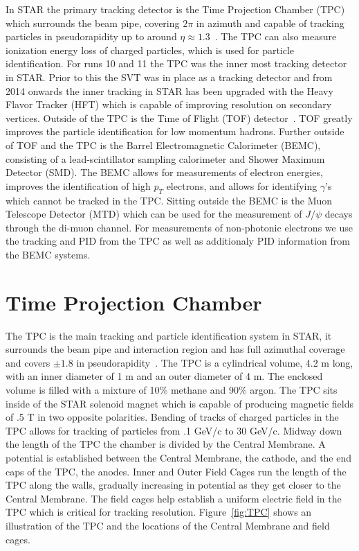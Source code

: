 In STAR the primary tracking detector is the Time Projection Chamber (TPC) which surrounds the beam pipe, covering $2\pi$ in azimuth and capable of tracking particles in pseudorapidity up to around $\eta \approx 1.3$~\cite{tpcNIM}. The TPC can also measure ionization energy loss of charged particles, which is used for particle identification. For runs 10 and 11 the TPC was the inner most tracking detector in STAR. Prior to this the SVT was in place as a tracking detector and from 2014 onwards the inner tracking in STAR has been upgraded with the Heavy Flavor Tracker (HFT) which is capable of improving resolution on secondary vertices. Outside of the TPC is the Time of Flight (TOF) detector~\cite{vpdNIM}. TOF greatly improves the particle identification for low momentum hadrons. Further outside of TOF and the TPC is the Barrel Electromagnetic Calorimeter (BEMC), consisting of a lead-scintillator sampling calorimeter and Shower Maximum Detector (SMD). The BEMC allows for measurements of electron energies, improves the identification of high $p_T$ electrons, and allows for identifying $\gamma$'s which cannot be tracked in the TPC. Sitting outside the BEMC is the Muon Telescope Detector (MTD) which can be used for the measurement of $J/\psi$ decays through the di-muon channel. For measurements of non-photonic electrons we use the tracking and PID from the TPC as well as additionaly PID information from the BEMC systems.

\section{Time Projection Chamber}

The TPC is the main tracking and particle identification system in STAR, it surrounds the beam pipe and interaction region and has full azimuthal coverage and covers $\pm 1.8$ in pseudorapidity~\cite{tpcNIM}. The TPC is a cylindrical volume, 4.2 m long, with an inner diameter of 1 m and an outer diameter of 4 m. The enclosed volume is filled with a mixture of 10\% methane and 90\% argon. The TPC sits inside of the STAR solenoid magnet which is capable of producing magnetic fields of .5 T in two opposite polarities. Bending of tracks of charged particles in the TPC allows for tracking of particles from .1 GeV/c to 30 GeV/c. Midway down the length of the TPC the chamber is divided by the Central Membrane. A potential is established between the Central Membrane, the cathode, and the end caps of the TPC, the anodes. Inner and Outer Field Cages run the length of the TPC along the walls, gradually increasing in potential as they get closer to the Central Membrane. The field cages help establish a uniform electric field in the TPC which is critical for tracking resolution. Figure~\ref{fig:TPC} shows an illustration of the TPC and the locations of the Central Membrane and field cages.

